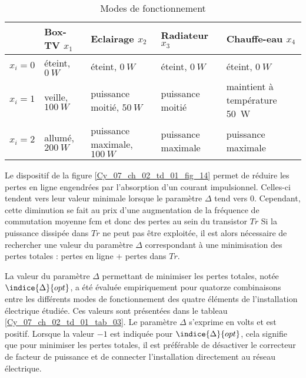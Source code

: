 \begin{table*}[!h]
\centering
\begin{tabular}{cp{3cm}p{3.5cm}p{3.5cm}p{3.5cm}}
\hline
& Box-TV $x_1$ & Eclairage $x_2$ & Radiateur $x_3$ & Chauffe-eau $x_4$  \\
\hline
$x_i = 0$ & éteint, $\SI{0}{W}$	& éteint, $\SI{0}{W}$	& éteint, $\SI{0}{W}$	& éteint, $\SI{0}{W}$ \\
$x_i = 1$ & veille, $\SI{100}{W}$	& puissance moitié, $\SI{50}{W}$	& puissance moitié & maintient à température \SI{50}{W}	\\
$x_i = 2$ & allumé, $\SI{200}{W}$	& puissance maximale, $\SI{100}{W}$	& puissance maximale & puissance maximale \\
\hline
\end{tabular}
\caption{Modes de fonctionnement \label{Cy_07_ch_02_td_01_tab_02}}
\end{table*}


Le dispositif de la figure \ref{Cy_07_ch_02_td_01_fig_14} permet de réduire les pertes
en ligne engendrées par l’absorption d’un courant impulsionnel. Celles-ci tendent vers leur
valeur minimale lorsque le paramètre $\Delta$ tend vers 0. Cependant, cette diminution se fait au
prix d’une augmentation de la fréquence de commutation moyenne fcm et donc des pertes
au sein du transistor $Tr$ %
Si la puissance dissipée dans $Tr$ ne peut pas être
exploitée, il est alors nécessaire de rechercher une valeur du paramètre $\Delta$ correspondant à
une minimisation des pertes totales : pertes en ligne + pertes dans $Tr$.

La valeur du paramètre $\Delta$ permettant de minimiser les pertes totales, notée $\indice{\Delta}{opt}$, a été évaluée empiriquement pour quatorze combinaisons entre les différents modes de fonctionnement
des quatre éléments de l’installation électrique étudiée. Ces valeurs sont présentées dans le
tableau \ref{Cy_07_ch_02_td_01_tab_03}. Le paramètre $\Delta$ s’exprime en volts et est positif. Lorsque la valeur $-1$ est indiquée
pour $\indice{\Delta}{opt}$, cela signifie que pour minimiser les pertes totales, il est préférable de désactiver
le correcteur de facteur de puissance et de connecter l’installation directement au réseau
électrique.

